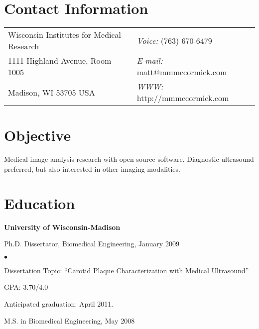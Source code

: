 \documentclass[margin,line]{res}
\newenvironment{list1}{
  \begin{list}{\ding{113}}{%
      \setlength{\itemsep}{0in}
      \setlength{\parsep}{0in} \setlength{\parskip}{0in}
      \setlength{\topsep}{0in} \setlength{\partopsep}{0in} 
      \setlength{\leftmargin}{0.17in}}}{\end{list}}
\newenvironment{list2}{
  \begin{list}{$\bullet$}{%
      \setlength{\itemsep}{0in}
      \setlength{\parsep}{0in} \setlength{\parskip}{0in}
      \setlength{\topsep}{0in} \setlength{\partopsep}{0in} 
      \setlength{\leftmargin}{0.2in}}}{\end{list}}
\begin{document}

\begin{resume}
\section{\sc Contact Information}
\vspace{.05in}
\begin{tabular}{@{}p{3in}p{4in}}
Wisconsin Institutes for Medical Research & {\it Voice:}  (763) 670-6479 \\            
1111 Highland Avenue, Room 1005           & {\it E-mail:}  matt@mmmccormick.com \\       
Madison, WI 53705 USA                     & {\it WWW:} http://mmmccormick.com\\     
\end{tabular}


\section{\sc Objective}
Medical image analysis research with open source software.  Diagnostic
ultrasound preferred, but also interested in other imaging modalities.

\section{\sc Education}
{\bf University of Wisconsin-Madison} \\
\vspace*{-.1in}
\begin{list1}
\item[] Ph.D. Dissertator, Biomedical Engineering, January 2009
\begin{list2}
\vspace*{.05in}
\item Dissertation Topic:  ``Carotid Plaque Characterization with Medical
Ultrasound''
\item GPA: 3.70/4.0
\item Anticipated graduation: April 2011.
\end{list2}
\vspace*{.05in}
\item[] M.S. in Biomedical Engineering, May 2008
\end{list1}


\end{resume}
\end{document}
